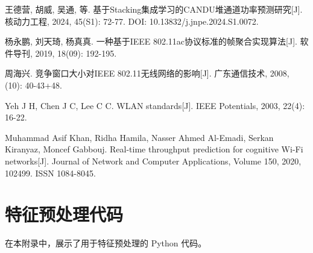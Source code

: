 \documentclass[bwprint]{gmcmthesis}
\begin{document}
\newpage

\begin{thebibliography}{9}
	
	王德营, 胡威, 吴通, 等. 基于Stacking集成学习的CANDU堆通道功率预测研究[J]. 核动力工程, 2024, 45(S1): 72-77. DOI: 10.13832/j.jnpe.2024.S1.0072.
	
	杨永鹏, 刘天琦, 杨真真. 一种基于IEEE 802.11ac协议标准的帧聚合实现算法[J]. 软件导刊, 2019, 18(09): 192-195.
	
	周海兴. 竞争窗口大小对IEEE 802.11无线网络的影响[J]. 广东通信技术, 2008, (10): 40-43+48.
	
	Yeh J H, Chen J C, Lee C C. WLAN standards[J]. IEEE Potentials, 2003, 22(4): 16-22.
	
	Muhammad Asif Khan, Ridha Hamila, Nasser Ahmed Al-Emadi, Serkan Kiranyaz, Moncef Gabbouj. Real-time throughput prediction for cognitive Wi-Fi networks[J]. Journal of Network and Computer Applications, Volume 150, 2020, 102499. ISSN 1084-8045.
	
\end{thebibliography}



\newpage

\appendix
\section{特征预处理代码}

\noindent 在本附录中，展示了用于特征预处理的 Python 代码。
\end{document}
